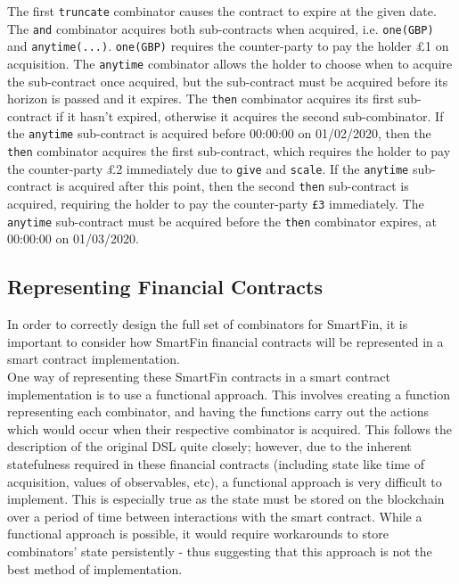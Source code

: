 The first \texttt{truncate} combinator causes the contract to expire at the given date. The \texttt{and} combinator acquires both sub-contracts when acquired, i.e. \texttt{one(GBP)} and \texttt{anytime(...)}. \texttt{one(GBP)} requires the counter-party to pay the holder £1 on acquisition. The \texttt{anytime} combinator allows the holder to choose when to acquire the sub-contract once acquired, but the sub-contract must be acquired before its horizon is passed and it expires. The \texttt{then} combinator acquires its first sub-contract if it hasn't expired, otherwise it acquires the second sub-combinator. If the \texttt{anytime} sub-contract is acquired before 00:00:00 on 01/02/2020, then the \texttt{then} combinator acquires the first sub-contract, which requires the holder to pay the counter-party £2 immediately due to \texttt{give} and \texttt{scale}. If the \texttt{anytime} sub-contract is acquired after this point, then the second \texttt{then} sub-contract is acquired, requiring the holder to pay the counter-party \texttt{£3} immediately. The \texttt{anytime} sub-contract must be acquired before the \texttt{then} combinator expires, at 00:00:00 on 01/03/2020.


\subsection{Representing Financial Contracts}

In order to correctly design the full set of combinators for SmartFin, it is important to consider how SmartFin financial contracts will be represented in a smart contract implementation. \\

One way of representing these SmartFin contracts in a smart contract implementation is to use a functional approach. This involves creating a function representing each combinator, and having the functions carry out the actions which would occur when their respective combinator is acquired. This follows the description of the original DSL quite closely; however, due to the inherent statefulness required in these financial contracts (including state like time of acquisition, values of observables, etc), a functional approach is very difficult to implement. This is especially true as the state must be stored on the blockchain over a period of time between interactions with the smart contract. While a functional approach is possible, it would require workarounds to store combinators' state persistently - thus suggesting that this approach is not the best method of implementation. \\

